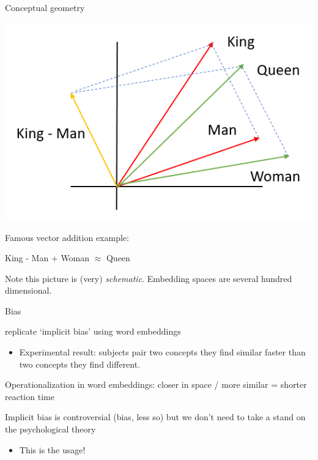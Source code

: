 \documentclass{hertieteaching}
\begin{document}



\begin{frame}[fragile]{Conceptual geometry}

\centerline{\includegraphics[scale = 0.5]{pictures/kingqueen}}

Famous vector addition example:
  
\centerline{King - Man + Woman $\approx$ Queen}

Note this picture is (very) \textit{schematic}. Embedding spaces are several hundred dimensional.

\end{frame}

\begin{frame}[fragile]{Bias}

\textcite{Caliskan.etal2017} replicate `implicit bias' using word embeddings
\begin{itemize}
  \item Experimental result: subjects pair two concepts they find similar faster than two concepts they find different. \parencite{Greenwald.etal1998} 
\end{itemize}

Operationalization in word embeddings: closer in space / more similar = shorter reaction time

\pause
\bigskip
Implicit bias is controversial (bias, less so) but we don't need to take a stand on the psychological theory
\begin{itemize}
  \item This is the usage!
\end{itemize}
\end{frame}
\end{document}
